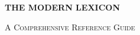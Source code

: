 \begin{titlepage}
    \thispagestyle{empty}
    \centering
    \vspace*{80mm}
    {\fontsize{28pt}{34pt}\selectfont\bfseries THE MODERN LEXICON\par}
    \vspace{5mm}
    {\fontsize{14pt}{18pt}\selectfont\scshape A Comprehensive Reference Guide\par}
    \vfill
\end{titlepage}

